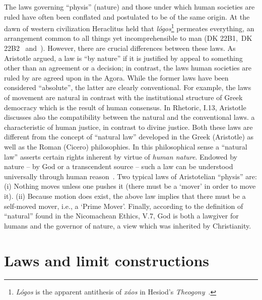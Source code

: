 \documentclass[12pt]{article}
\begin{document}
The laws governing ``physis'' (nature) and those under which human societies are ruled have often been conflated
and postulated to be of the same origin.
At the dawn of western civilization Heraclitus held that {\it l\'ogos}\footnote{{\it L\'ogos} is the apparent antithesis of {\it x\'aos} in
Hesiod's {\it Theogony}~\cite{hesiod+700-2}.} permeates everything,
an arrangement common to all things yet incomprehensible to man
(DK 22B1,~DK 22B2~ \cite{Diels-fdv,Curd-PresocReader}   and~\cite[197,~198]{ki-57}).
However,
there are  crucial differences between these laws. As
Aristotle argued, a law is ``by nature'' if it is justified by appeal to something other than an agreement or a decision; in
contrast, the laws human societies are ruled by are agreed upon in the Agora. While the former laws have been considered  ``absolute'', the
latter are clearly conventional. For example, the laws of movement are natural  in contrast with
the institutional structure of Greek democracy which is the result of human consensus.
In Rhetoric, I.13, Aristotle discusses also the compatibility between
the natural and the conventional laws.
a  characteristic of human justice, in contrast to divine justice. Both these
laws are different from the concept of ``natural law'' developed in the Greek (Aristotle) as well as the Roman
(Cicero) philosophies. In this philosophical sense a ``natural law''
asserts certain rights inherent by virtue of {\it  human nature}.
Endowed by nature -- by God or a transcendent source -- such a law can be understood universally through human
reason~\cite{natural_law2009}.
Two typical laws of Aristotelian   ``physis'' are:
(i) Nothing moves unless one pushes it (there must be a `mover' in order to move it).
(ii) Because motion does exist, the above law implies that there must be a self-moved mover, i.e., a `Prime
Mover'.
Finally, according to the definition of ``natural'' found in the Nicomachean Ethics, V.7, God is both a lawgiver
for humans and the governor of nature,
a view which was inherited by Christianity.


\section{Laws and limit constructions}
\end{document}
